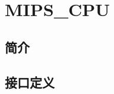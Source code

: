 \documentclass{article}
\begin{document}
\section{MIPS_CPU}
\label{sec:MIPS_CPU}

\subsection{简介}

\FloatBarrier
\subsection{接口定义}

\begin{center}




    \tablelasttail{\bottomrule}

    \small
    \begin{supertabular}{llllp{4.5cm}p{2.5cm}}


\end{supertabular}
\end{center}
\end{document}
